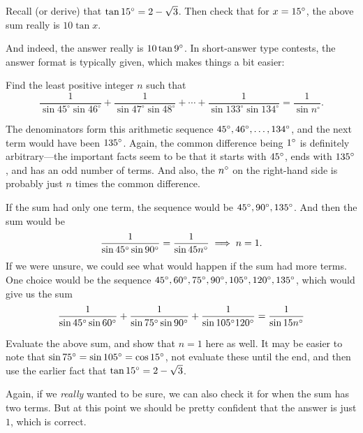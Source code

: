 \documentclass[11pt,paper=letter]{scrartcl}
\begin{document}
\begin{exrboxed}
  Recall (or derive) that $\tan 15^\circ = 2 - \sqrt{3}$. Then check that for $x = 15^\circ$, the above sum really is $10 \tan x$.
\end{exrboxed}

And indeed, the answer really is $10 \tan 9^\circ$. In short-answer type contests, the answer format is typically given, which makes things a bit easier:

\begin{exboxed}[AIME II 2000/15]
  Find the least positive integer $n$ such that \[ \frac 1{\sin 45^\circ\sin 46^\circ}+\frac 1{\sin 47^\circ\sin 48^\circ}+\cdots+\frac 1{\sin 133^\circ\sin 134^\circ}=\frac 1{\sin n^\circ}. \]
\end{exboxed}

The denominators form this arithmetic sequence $45^\circ, 46^\circ, \ldots, 134^\circ$, and the next term would have been $135^\circ$. Again, the common difference being $1^\circ$ is definitely arbitrary---the important facts seem to be that it starts with $45^\circ$, ends with $135^\circ$, and has an odd number of terms. And also, the $n^\circ$ on the right-hand side is probably just $n$ times the common difference.

If the sum had only one term, the sequence would be $45^\circ, 90^\circ, 135^\circ$. And then the sum would be
\[
  \frac{1}{\sin 45^\circ \sin 90^\circ} = \frac{1}{\sin 45n^\circ} \implies n = 1.
\]
If we were unsure, we could see what would happen if the sum had more terms. One choice would be the sequence $45^\circ, 60^\circ, 75^\circ, 90^\circ, 105^\circ, 120^\circ, 135^\circ$, which would give us the sum
\[
  \frac{1}{\sin 45^\circ \sin 60^\circ} + \frac{1}{\sin 75^\circ \sin 90^\circ} + \frac{1}{\sin 105^\circ 120^\circ} = \frac{1}{\sin 15n^\circ}
\]
\begin{exrboxed}
Evaluate the above sum, and show that $n = 1$ here as well. It may be easier to note that $\sin 75^\circ = \sin 105^\circ = \cos 15^\circ$, not evaluate these until the end, and then use the earlier fact that $\tan 15^\circ = 2 - \sqrt{3}$.
\end{exrboxed}
Again, if we \textit{really} wanted to be sure, we can also check it for when the sum has two terms. But at this point we should be pretty confident that the answer is just $1$, which is correct.
\end{document}
